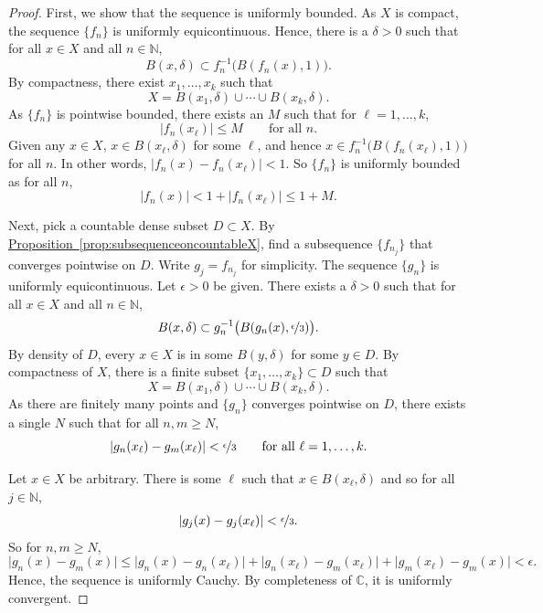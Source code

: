 \documentclass[12pt,openany]{book}
\newcommand{\sabs}[1]{\lvert {#1} \rvert}
\newcommand{\C}{{\mathbb{C}}}
\newcommand{\N}{{\mathbb{N}}}
\theoremstyle{plain}
\theoremstyle{remark}
\theoremstyle{definition}
\theoremstyle{exercise}
\theoremstyle{example}
\newcommand{\propref}[1]{\hyperref[#1]{Proposition~\ref*{#1}}}
\begin{document}
\begin{proof}
First, we show that the sequence is uniformly bounded.
As $X$ is compact, the sequence $\{ f_n \}$ is uniformly
equicontinuous.
Hence,
there is a $\delta > 0$
such that
for all $x \in X$ and all $n \in \N$,
\begin{equation*}
B(x,\delta) \subset f_n^{-1}\bigl(B(f_n(x),1)\bigr) .
\end{equation*}
By compactness,
there exist $x_1,\ldots,x_k$ such that
\begin{equation*}
X = 
B(x_1,\delta)
\cup \cdots \cup
B(x_k,\delta) .
\end{equation*}
As $\{ f_n \}$ is pointwise bounded, there exists an $M$
such that for $\ell=1,\ldots,k$,
\begin{equation*}
\sabs{f_n(x_\ell)} \leq M \qquad \text{for all } n.
\end{equation*}
Given any
$x \in X$, $x \in B(x_\ell,\delta)$ for some $\ell$, and
hence
$x \in f_n^{-1}\bigl(B(f_n(x_\ell),1)\bigr)$
for all $n$.
In other words,
$\sabs{f_n(x)-f_n(x_\ell)} < 1$.  So $\{ f_n \}$ is uniformly bounded as
for all $n$,
\begin{equation*}
\sabs{f_n(x)} < 1+ \sabs{f_n(x_\ell)} \leq 1+M .
\end{equation*}

Next, pick a countable dense subset $D \subset X$.
By \propref{prop:subsequenceoncountableX}, find
a subsequence $\{ f_{n_j} \}$ that converges pointwise on $D$.
Write $g_j = f_{n_j}$ for simplicity.
The sequence $\{ g_n \}$ is 
uniformly equicontinuous.
Let $\epsilon > 0$ be given.  There exists a $\delta > 0$
such that for all $x \in X$ and all $n \in \N$,
\begin{equation*}
B(x,\delta) \subset g_n^{-1}\bigl(B(g_n(x),\nicefrac{\epsilon}{3})\bigr).
\end{equation*}
By density of $D$, every $x \in X$ is in some $B(y,\delta)$
for some $y \in D$.  By compactness of $X$,
there is a finite subset $\{ x_1,\ldots,x_k \} \subset D$
such that
\begin{equation*}
X = 
B(x_1,\delta)
\cup \cdots \cup
B(x_k,\delta) .
\end{equation*}
As there are finitely many points and $\{ g_n \}$
converges pointwise on $D$, there exists a single $N$ such that for 
all $n,m \geq N$,
\begin{equation*}
\sabs{g_n(x_\ell)-g_m(x_\ell)} < \nicefrac{\epsilon}{3}
 \qquad \text{for all } \ell=1,\ldots,k.
\end{equation*}

Let $x \in X$ be arbitrary.  There is some $\ell$ such that
$x \in B(x_\ell,\delta)$ and so for all $j \in \N$,
\begin{equation*}
\sabs{g_j(x)-g_j(x_\ell)} < \nicefrac{\epsilon}{3}.
\end{equation*}
So for $n,m \geq N$,
\begin{equation*}
\sabs{g_n(x)-g_m(x)} \leq
\sabs{g_n(x)-g_n(x_\ell)} +
\sabs{g_n(x_\ell)-g_m(x_\ell)} +
\sabs{g_m(x_\ell)-g_m(x)} <
\epsilon .
\end{equation*}
Hence, the sequence is uniformly Cauchy.  By completeness of $\C$,
it is uniformly convergent.
\end{proof}
\end{document}
